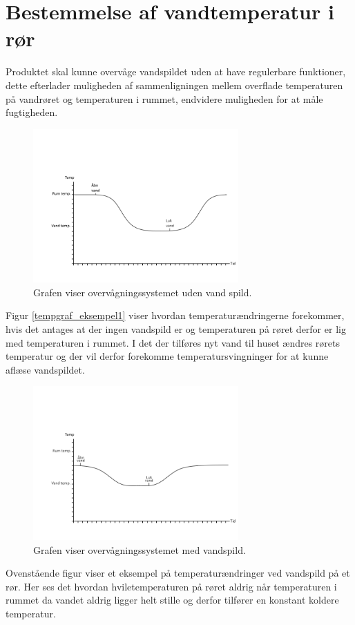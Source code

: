 \section{Bestemmelse af vandtemperatur i rør}
Produktet skal kunne overvåge vandspildet uden at have regulerbare funktioner, dette efterlader muligheden af sammenligningen mellem overflade temperaturen på vandrøret og temperaturen i rummet, endvidere muligheden for at måle fugtigheden.  

\begin{figure}[h!]
  \centering
  \includegraphics[width=0.7\textwidth]{figures/vandspild_graf_normal.png}
  \caption{Grafen viser overvågningssystemet uden vand spild.}
  \label{vandspild_graf_normal}
\end{figure}



Figur \ref{tempgraf_eksempel1} viser hvordan temperaturændringerne forekommer, hvis det antages at der ingen vandspild er og temperaturen på røret derfor er lig med temperaturen i rummet. I det der tilføres nyt vand til huset ændres rørets temperatur og der vil derfor forekomme temperatursvingninger for at kunne aflæse vandspildet.





\begin{figure}[h!]
  \centering
  \includegraphics[width=0.7\textwidth]{figures/vandspild_graf_spild.png}
  \caption{Grafen viser overvågningssystemet med vandspild.}
  \label{vandspild_graf_spild}
\end{figure}


Ovenstående figur viser et eksempel på temperaturændringer ved vandspild på et rør. Her ses det hvordan hviletemperaturen på røret aldrig når temperaturen i rummet da vandet aldrig ligger helt stille og derfor tilfører en konstant koldere temperatur.  



    